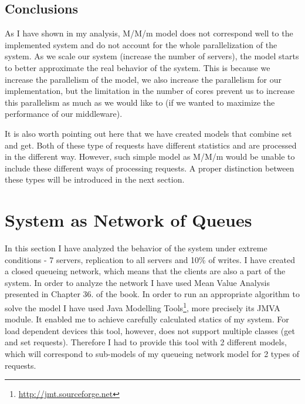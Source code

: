 \documentclass[11pt]{article}
\begin{document}
\subsection{Conclusions}
As I have shown in my analysis, M/M/m model does not correspond well to the implemented system and do not account for the whole parallelization of the system. As we scale our system (increase the number of servers), the model starts to better approximate the real behavior of the system. This is because we increase the parallelism of the model, we also increase the parallelism for our implementation, but the limitation in the number of cores prevent us to increase this parallelism as much as we would like to (if we wanted to maximize the performance of our middleware).

It is also worth pointing out here that we have created models that combine set and get. Both of these type of requests have different statistics and are processed in the different way. However, such simple model as M/M/m would be unable to include these different ways of processing requests. A proper distinction between these types will be introduced in the next section.

\clearpage

\section{System as Network of Queues}\label{sec:network-of-queues}

In this section I have analyzed the behavior of the system under extreme conditions - 7 servers, replication to all servers and 10\% of writes. I have created a closed queueing network, which means that the clients are also a part of the system. In order to analyze the network I have used Mean Value Analysis presented in Chapter 36. of the book. In order to run an appropriate algorithm to solve the model I have used Java Modelling Tools\footnote{\url{http://jmt.sourceforge.net}}, more precisely its JMVA module. It enabled me to achieve carefully calculated statics of my system. For load dependent devices this tool, however, does not support multiple classes (get and set requests). Therefore I had to provide this tool with 2 different models, which will correspond to sub-models of my queueing network model for 2 types of requests.
\end{document}
